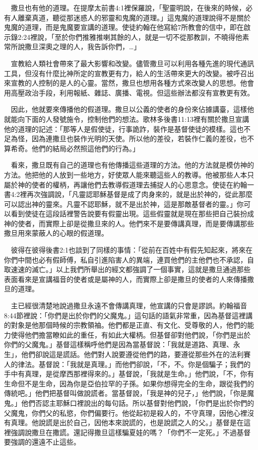 \documentclass{book}
\begin{document}
　撒旦也有他的道理。在提摩太前書4:1裡保羅說，「聖靈明說，在後來的時候，必有人離棄真道，聽從那迷惑人的邪靈和鬼魔的道理。」這鬼魔的道理說得不是關於鬼魔的道理，而是鬼魔要宣講的道理。使徒約翰在他寫給7所教會的信中，即在啟示錄2:24裡說，「至於你們推雅推喇其餘的人，就是一切不從那教訓，不曉得他素常所說撒旦深奧之理的人，我告訴你們，…」

　宣教給人類社會帶來了最大影響和改變。儘管撒旦可以利用各種先進的現代通訊工具，但沒有什麼比神所定的宣教更有力，給人的生活帶來更大的改變。被呼召出來宣教的人控制的是人的心靈。當然，撒旦也想用各種方式來改變人的思想。他會用高壓政治手段，利用報紙、雜誌、廣播、電視。但這些辦法都沒有宣教更有效。

　因此，他就要來傳播他的假道理。撒旦以公義的使者的身份來佔據講臺，這樣他就能向下面的人發號施令，控制他們的想法。歌林多後書11:13裡有關於撒旦宣講他的道理的記述：「那等人是假使徒，行事詭詐，裝作是基督使徒的模樣。這也不足為怪，因為連撒旦也裝作光明的天使。所以他的差役，若裝作仁義的差役，也不算希奇。他們的結局必然照這他們的行為。」

　看來，撒旦既有自己的道理也有他傳播這些道理的方法。他的方法就是模仿神的方法。他把他的人放到一些地方，好使眾人能來聽這些人的教導。他被那些人本只屬於神的使者的權柄，再讓他們去教導假道理去捕捉人的心思意念。使徒在約翰一書4:2裡再次強調說，「凡靈認耶穌基督是成了肉身來的，就是出於神的，從此那麼可以認出神的靈來。凡靈不認耶穌，就不是出於神，這是那敵基督者的靈。」你可以看到使徒在這段話裡警告說要有假靈出現。這些假靈就是現在那些把自己裝扮成神的使者，而實際上卻是從撒旦來的人。他們來不是要傳講真理，而是要傳講那些撒旦用來蒙蔽人的心眼的假道理。

　彼得在彼得後書2:1也談到了同樣的事情：「從前在百姓中有假先知起來，將來在你們中間也必有假師傅，私自引進陷害人的異端，連買他們的主他們也不承認，自取速速的滅亡。」以上我們所舉出的經文都強調了一個事實，這就是撒旦通過那些表面看來是宣講福音的使者或是屬神的人，而實際上卻是撒旦的使者的人來傳播撒旦的道理。

　主已經很清楚地說過撒旦永遠不會傳講真理，他宣講的只會是謬誤。約翰福音8:44節裡說：「你們是出於你們的父魔鬼。」這句話的語氣非常重，因為基督這裡講的對象是他那個時候的宗教領袖。他們都是正直、有文化、受尊敬的人，他們的能力使得他們擔當瞭如此的重任，有如此大權柄。但基督卻對他們說，「你們是出於你們的父魔鬼。」基督這樣稱呼他們是因為當基督說：「我就是道路、真理、永生」，他們卻說這是謊話。他們對人說要遵從他們的路，要遵從那些外在的法利賽人的律法。基督說：「我就是真理。」而他們卻說，「不，不。你是個騙子；我們的手中有真理，是從摩西那裡得來的。」基督說，「我就是生命。」他們說，「不，你有生命但不是生命，因為你是亞伯拉罕的子孫。如果你想得完全的生命，跟從我們的傳統吧。」他們把基督叫做說謊者。當基督說，「我是神的兒子，」他們說，「你是魔鬼。」他們否認主耶穌口裡說出的每句話。所以基督對他們說，「你們是出於你們的父魔鬼，你們父的私慾，你們偏要行。他從起初是殺人的，不守真理，因他心裡沒有真理。他說謊是出於自己，因他本來說謊的，也是說謊之人的父。」基督是在這裡強調說撒旦在撒謊。還記得撒旦這樣騙夏娃的嗎？「你們不一定死。」不過基督要強調的還遠不止這些。
\end{document}
